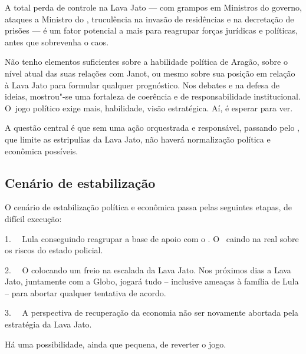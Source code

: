 A total perda de controle na Lava Jato --- com grampos em Ministros do
governo, ataques a Ministro do , truculência na invasão de
residências e na decretação de prisões --- é um fator potencial a mais
para reagrupar forças jurídicas e políticas, antes que sobrevenha o
caos.

Não tenho elementos suficientes sobre a habilidade política de Aragão,
sobre o nível atual das suas relações com Janot, ou mesmo sobre sua
posição em relação à Lava Jato para formular qualquer prognóstico. Nos
debates e na defesa de ideias, mostrou"-se uma fortaleza de coerência e
de responsabilidade institucional. O~jogo político exige mais,
habilidade, visão estratégica. Aí, é esperar para ver.

A questão central é que sem uma ação orquestrada e responsável, passando
pelo , que limite as estripulias da Lava Jato, não haverá
normalização política e econômica possíveis.

\subsection{Cenário de estabilização}

O cenário de estabilização política e econômica passa pelas seguintes
etapas, de difícil execução:

1.~~ Lula conseguindo reagrupar a base de apoio com o . O~
caindo na real sobre os riscos do estado policial.

2.~~ O  colocando um freio na escalada da Lava Jato. Nos próximos
dias a Lava Jato, juntamente com a Globo, jogará tudo -- inclusive
ameaças à família de Lula -- para abortar qualquer tentativa de acordo.

3.~~ A perspectiva de recuperação da economia não ser novamente abortada
pela estratégia da Lava Jato.

Há uma possibilidade, ainda que pequena, de reverter o jogo.
